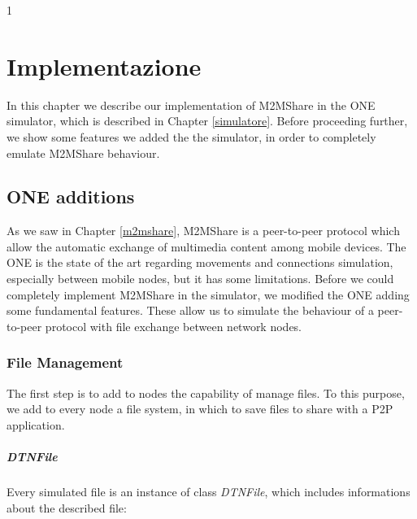 
1\chapter{Implementazione}\label{implementazione} %



\graphicspath{{6-implementazione/img/}}


In this chapter we describe our implementation of M2MShare in the ONE simulator, which is described in Chapter \ref{simulatore}. Before proceeding further, we show some features we added the the simulator, in order to completely emulate M2MShare behaviour.
  

\section{ONE additions}
As we saw in Chapter \ref{m2mshare}, M2MShare is a peer-to-peer protocol which allow the automatic exchange of multimedia content among mobile devices. The ONE is the state of the art regarding movements and connections simulation, especially between mobile nodes, but it has some limitations. Before we could completely implement M2MShare in the simulator, we modified the ONE adding some fundamental features. These allow us to simulate the behaviour of a peer-to-peer protocol with file exchange between network nodes.


\subsection{File Management}
The first step is to add to nodes the capability of manage files. To this purpose, we add to every node a file system, in which to save files to share with a P2P application. 


\paragraph{DTNFile}
Every simulated file is an instance of class \textit{DTNFile}, which includes informations about the described file:

